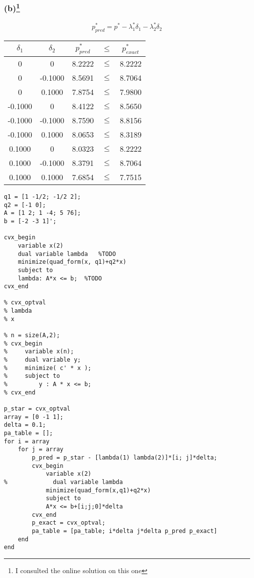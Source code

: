 \documentclass{article}
\begin{document}
\subsubsection*{(b)\footnote{I consulted the online solution on this one}}
\[p_{pred}^*  = p^* - \lambda_1^*\delta_1 - \lambda_2^*\delta_2 \]
\begin{center}
  \begin{tabular}{ | c | c | c | c | c |}
  \hline
    $\delta_1$ & $\delta_2$ & $p^*_{pred} $ & $\le$ & $p^*_{exact}$ \\ \hline
    0 &        0  &  8.2222  &$\le$ &  8.2222 \\ 
    0&   -0.1000    &8.5691  & $\le$ & 8.7064 \\ 
    0    &0.1000    &7.8754  & $\le$  &7.9800 \\ \hline
    -0.1000&         0 &   8.4122 & $\le$&    8.5650 \\ 
    -0.1000&   -0.1000  &  8.7590& $\le$  &  8.8156 \\ 
    -0.1000&    0.1000  &  8.0653  & $\le$&  8.3189 \\ \hline
    0.1000 &        0   & 8.0323   & $\le$& 8.2222 \\ 
    0.1000 &  -0.1000    & 8.3791 & $\le$  & 8.7064 \\ 
    0.1000 &   0.1000   & 7.6854  & $\le$ & 7.7515 \\ \hline
  \end{tabular}
\end{center}
\begin{verbatim}
q1 = [1 -1/2; -1/2 2];
q2 = [-1 0];
A = [1 2; 1 -4; 5 76];
b = [-2 -3 1]';

cvx_begin
    variable x(2)
    dual variable lambda   %TODO
    minimize(quad_form(x, q1)+q2*x)
    subject to 
    lambda: A*x <= b;  %TODO
cvx_end

% cvx_optval
% lambda
% x

% n = size(A,2);
% cvx_begin
%     variable x(n);
%     dual variable y;
%     minimize( c' * x );
%     subject to
%         y : A * x <= b;
% cvx_end

p_star = cvx_optval
array = [0 -1 1];
delta = 0.1;
pa_table = [];
for i = array
    for j = array
        p_pred = p_star - [lambda(1) lambda(2)]*[i; j]*delta;
        cvx_begin
            variable x(2)
%             dual variable lambda
            minimize(quad_form(x,q1)+q2*x)
            subject to
            A*x <= b+[i;j;0]*delta
        cvx_end
        p_exact = cvx_optval;
        pa_table = [pa_table; i*delta j*delta p_pred p_exact]
    end
end
\end{verbatim}
\end{document}
